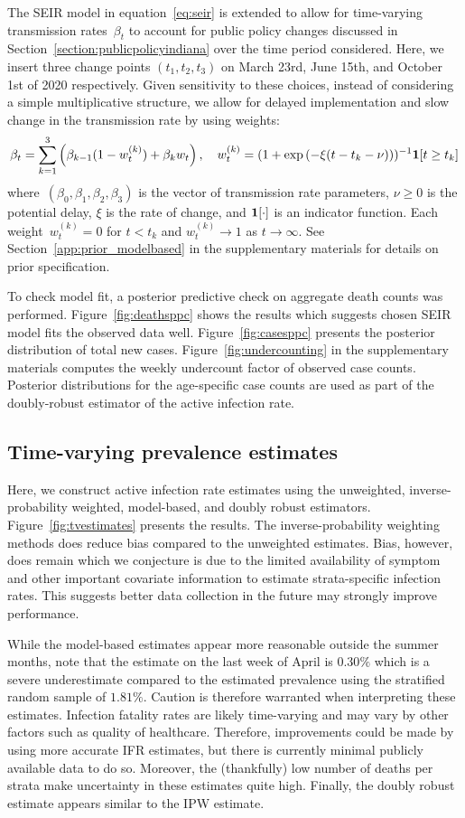 \documentclass[11pt]{amsart}
\numberwithin{equation}{section}
\theoremstyle{plain}
\begin{document}
 The SEIR model in equation~\eqref{eq:seir} is extended to allow for time-varying transmission rates~$\beta_t$ to account for public policy changes discussed in Section~\ref{section:publicpolicyindiana} over the time period considered.  Here, we insert three change points $(t_1,t_2,t_3)$ on March 23rd, June 15th, and October 1st of 2020 respectively.  Given sensitivity to these choices, instead of considering a simple multiplicative structure, we allow for delayed implementation and slow change in the transmission rate by using weights:
 $$
 \beta_t = \sum_{k=1}^{3} \left(\beta_{k-1} (1-w^{(k)}_t ) + \beta_{k} w_t\right),\quad w^{(k)}_t = (1 + \exp \left( -\xi (t - t_k - \nu) \right))^{-1} {\bf 1}[t \geq t_k]
 $$
 where~$(\beta_0,\beta_1, \beta_2, \beta_3)$ is the vector of transmission rate parameters, $\nu \geq 0$ is the potential delay, $\xi$ is the rate of change, and ${\bf 1}[\cdot]$ is an indicator function.  Each weight~$w_t^{(k)} = 0$ for $t < t_k$ and $w_t^{(k)} \to 1$ as $t \to \infty$. See Section~\ref{app:prior_modelbased} in the supplementary materials for details on prior specification.

 To check model fit, a posterior predictive check on aggregate death counts was performed. Figure~\ref{fig:deathsppc} shows the results which suggests chosen SEIR model fits the observed data well. Figure~\ref{fig:casesppc} presents the posterior distribution of total new cases.  Figure~\ref{fig:undercounting} in the supplementary materials computes the weekly undercount factor of observed case counts.  Posterior distributions for the age-specific case counts are used as part of the doubly-robust estimator of the active infection rate.


 \subsection{Time-varying prevalence estimates}

 Here, we construct active infection rate estimates using the unweighted, inverse-probability weighted, model-based, and doubly robust estimators.  Figure~\ref{fig:tvestimates} presents the results. The inverse-probability weighting methods does reduce bias compared to the unweighted estimates. Bias, however, does remain which we conjecture is due to the limited availability of symptom and other important covariate information to estimate strata-specific infection rates. This suggests better data collection in the future may strongly improve performance.

 While the model-based estimates appear more reasonable outside the summer months, note that the estimate on the last week of April is $0.30\%$ which is a severe underestimate compared to the estimated prevalence using the stratified random sample of $1.81\%$. Caution is therefore warranted when interpreting these estimates.  Infection fatality rates are likely time-varying and may vary by other factors such as quality of healthcare.  Therefore, improvements could be made by using more accurate IFR estimates, but there is currently minimal publicly available data to do so.  Moreover, the (thankfully) low number of deaths per strata make uncertainty in these estimates quite high.  Finally, the doubly robust estimate appears similar to the IPW estimate.
\end{document}
